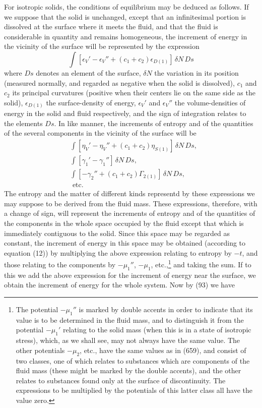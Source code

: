 \documentclass[12pt]{memoir}
\newcommand{\dd}{\delta}
\begin{document}
For isotropic solids, the conditions of equilibrium may be deduced as follows. If we suppose that the solid is unchanged, except that an infinitesimal portion is dissolved at the surface where it meets the fluid, and that the fluid is considerable in quantity and remains homogeneous, the increment of energy in the vicinity of the surface will be represented by the expression
$$\int \left[\epsilon_V'-\epsilon_V'' + (c_1 + c_2)\epsilon_{D(1)}\right] \, \dd N \,Ds$$
where $Ds$ denotes an element of the surface, $\dd N$ the variation in its position (measured normally, and regarded as negative when the solid is dissolved), $c_1$ and $c_2$ its principal curvatures (positive when their centers lie on the same side as the solid), $\epsilon_{D(1)}$ the surface-density of energy, $\epsilon_V'$ and $\epsilon_V''$ the volume-densities of energy in the solid and fluid respectively, and the sign of integration relates to the elements $Ds$. In like manner, the increments of entropy and of the quantities of the several components in the vicinity of the surface will be
\begin{align*}
& \int[\eta_V'-  \eta_V'' + (c_1 + c_2)\eta_{S(1)}] \, \dd N \, Ds,\\
& \int[\gamma_1'-\gamma_1''] \, \dd N \, Ds, \\
& \int[-\gamma_2'' +(c_1 + c_2)\Gamma_{2(1)}]\, \dd N \, Ds, \\
& \text{  etc.}\end{align*}
The entropy and the matter of different kinds representd by these expressions we may suppose to be derived from the fluid mass. These expressions, therefore, with a change of sign, will represent the increments of entropy and of the quantities of the components in the whole space occupied by the fluid except that which is immediately contiguous to the solid. Since this space may be regarded as constant, the increment of energy in this space may be obtained (according to equation (12)) by multiplying the above expression relating to entropy by $-t$, and those relating to the components by $-\mu_1''$, $-\mu_1$, etc.,\footnote{The potential $-\mu_1''$ is marked by double accents in order to indicate that its value is to be determined in the fluid mass, and to distinguish it from the potential $-\mu_1'$ relating to the solid mass (when this is in a state of isotropic stress), which, as we shall see, may not always have the same value. The other potentials $-\mu_2$, etc., have the same values as in (659), and consist of two classes, one of which relates to substances which are components of the fluid mass (these might be marked by the double accents), and the other relates to substances found only at the surface of discontinuity. The expressions to be multiplied by the potentials of this latter class all have the value zero.} and taking the sum. If to this we add the above expression for the increment of energy near the surface, we obtain the increment of energy for the whole system. Now by (93) we have
\end{document}
